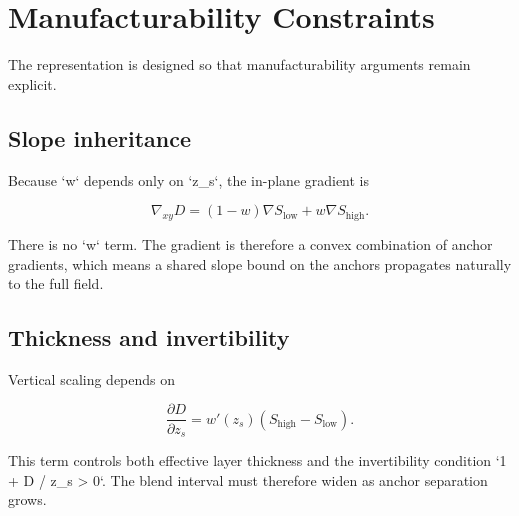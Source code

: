 \section{Manufacturability Constraints}

The representation is designed so that manufacturability arguments remain explicit.

\subsection{Slope inheritance}

Because `w` depends only on `z_s`, the in-plane gradient is

\[
\nabla_{xy} D = (1-w)\nabla S_{\text{low}} + w \nabla S_{\text{high}}.
\]

There is no `\nabla w` term. The gradient is therefore a convex combination of anchor gradients, which means a shared slope bound on the anchors propagates naturally to the full field.

\subsection{Thickness and invertibility}

Vertical scaling depends on

\[
\frac{\partial D}{\partial z_s} = w'(z_s)\left(S_{\text{high}} - S_{\text{low}}\right).
\]

This term controls both effective layer thickness and the invertibility condition `1 + \partial D / \partial z_s > 0`. The blend interval must therefore widen as anchor separation grows.
